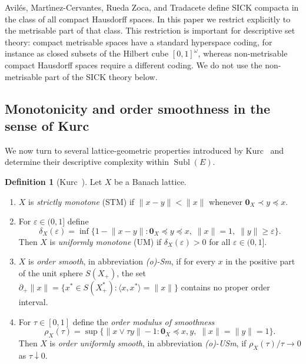 \documentclass[12pt]{amsart}
\renewcommand{\ge}{\geqslant}
\theoremstyle{plain}
\theoremstyle{definition}
\newtheorem{definition}[theorem]{Definition}
\theoremstyle{remark}
\DeclareMathOperator{\Subl}{Subl}
\begin{document}
Avil\'es, Mart\'\i nez-Cervantes, Rueda Zoca, and Tradacete define SICK compacta
in the class of all compact Hausdorff spaces.  In this paper we restrict
explicitly to the metrisable part of that class.  This restriction is important
for descriptive set theory: compact metrisable spaces have a standard
hyperspace coding, for instance as closed subsets of the Hilbert cube
$[0,1]^\omega$, whereas non-metrisable compact Hausdorff spaces require a
different coding.  We do not use the non-metrisable part of the SICK theory
below.

\subsection{Monotonicity and order smoothness in the sense of Kurc}\label{subsec:kurc}

We now turn to several lattice-geometric properties introduced by
Kurc~\cite{Kurc1993Dual} and determine their descriptive complexity within
$\Subl(E)$.

\begin{definition}[Kurc~\cite{Kurc1993Dual}]\label{def:kurc}
Let $X$ be a Banach lattice.
\begin{enumerate}[label=(\roman*)]
    \item $X$ is \emph{strictly monotone} (STM) if $\lVert x - y \rVert < \lVert x \rVert$
      whenever $\mathbf{0}_X \prec y \preceq x$.
    \item For $\varepsilon \in (0, 1]$ define
      \[
          \delta_X(\varepsilon)
          = \inf\bigl\{1 - \lVert x - y \rVert \colon
            \mathbf{0}_X \preceq y \preceq x,\;
            \lVert x \rVert = 1,\;
            \lVert y \rVert \ge \varepsilon\bigr\}.
      \]
      Then $X$ is \emph{uniformly monotone} (UM) if $\delta_X(\varepsilon) > 0$
      for all $\varepsilon \in (0, 1]$.
    \item $X$ is \emph{order smooth}, in abbreviation \emph{(o)-Sm}, if for
      every $x$ in the positive part of the unit sphere $S(X_+)$, the set
      $\partial_+\lVert x \rVert
      = \{x^* \in S(X^*_+) \colon \langle x, x^* \rangle = \lVert x \rVert\}$
      contains no proper order interval.
    \item For $\tau \in [0, 1]$ define the \emph{order modulus of smoothness}
      \[
          \rho_X(\tau)
          = \sup\bigl\{\lVert x \vee \tau y \rVert - 1 \colon
            \mathbf{0}_X \preceq x, y,\;
            \lVert x \rVert = \lVert y \rVert = 1\bigr\}.
      \]
      Then $X$ is \emph{order uniformly smooth}, in abbreviation
      \emph{(o)-USm}, if $\rho_X(\tau) / \tau \to 0$ as $\tau \downarrow 0$.
\end{enumerate}
\end{definition}
\end{document}

